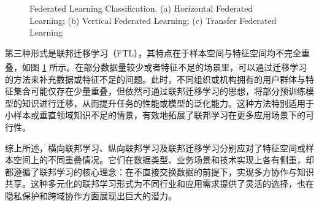 \vspace{-0.1cm}
\begin{figure}[h]
	\centering
	\hspace{0.01\textwidth}
	\hspace{0.01\textwidth}
	{\centering \wuhao Federated Learning Classification. (a) Horizontal Federated Learning; (b) Vertical Federated Learning; (c) Transfer Federated Learning}	
	\label{FedClass}
\end{figure}
\vspace{-0.35cm}

第三种形式是联邦迁移学习（FTL），其特点在于样本空间与特征空间均不完全重叠\textsuperscript{\cite{yang2019federated,chen2020vafl}}，如图 \ref{FedClass} 所示。在部分数据量较少或者特征不足的场景里，可以通过迁移学习的方法来补充数据或特征不足的问题。此时，不同组织或机构拥有的用户群体与特征集合可能仅存在少量重叠，但依然可通过联邦迁移学习的思想，将部分预训练模型的知识进行迁移，从而提升任务的性能或模型的泛化能力。这种方法特别适用于小样本或垂直领域知识不足的情景，有效地拓展了联邦学习在更多应用场景下的可行性。

综上所述，横向联邦学习、纵向联邦学习及联邦迁移学习分别应对了特征空间或样本空间上的不同重叠情况。它们在数据类型、业务场景和技术实现上各有侧重，却都遵循了联邦学习的核心理念：在不直接交换数据的前提下，实现多方协作与知识共享。这种多元化的联邦学习形式为不同行业和应用需求提供了灵活的选择，也在隐私保护和跨域协作方面展现出巨大的潜力。
